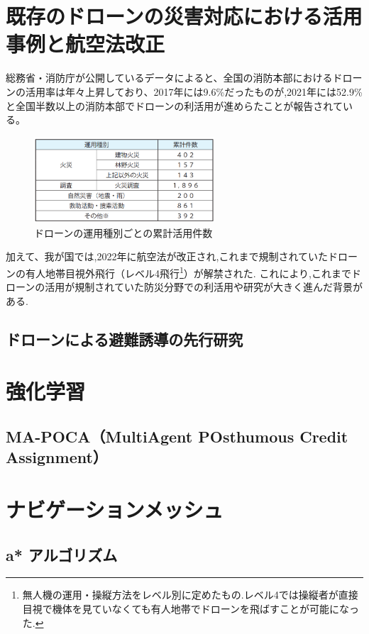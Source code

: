 \section{既存のドローンの災害対応における活用事例と航空法改正}
総務省・消防庁が公開しているデータ\cite{soumusho-01}によると、全国の消防本部におけるドローンの活用率は年々上昇しており、2017年には9.6\%だったものが,2021年には52.9\%と全国半数以上の消防本部でドローンの利活用が進めらたことが報告されている。
\begin{figure}[H] 
  \centering 
  \includegraphics[width=0.6\textwidth]{Figures/2024-11-28 215911.png}
  \caption{ドローンの運用種別ごとの累計活用件数} 
  \label{fig:01} 
\end{figure}

加えて、我が国では,2022年に航空法が改正され,これまで規制されていたドローンの有人地帯目視外飛行（レベル4飛行\footnote{無人機の運用・操縦方法をレベル別に定めたもの.レベル4では操縦者が直接目視で機体を見ていなくても有人地帯でドローンを飛ばすことが可能になった.}）が解禁された.
これにより,これまでドローンの活用が規制されていた防災分野での利活用や研究が大きく進んだ背景がある.\par 
\subsection{ドローンによる避難誘導の先行研究}



\section{強化学習}
  \subsection{MA-POCA（MultiAgent POsthumous Credit Assignment）}
\section{ナビゲーションメッシュ}
  \subsection{a* アルゴリズム}

